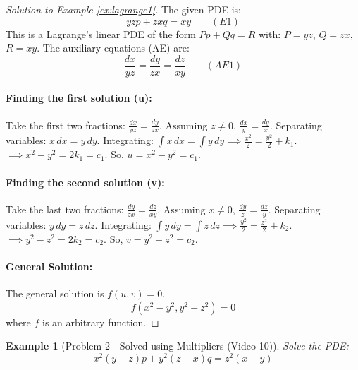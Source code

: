 \documentclass{article}
\newtheorem{example}{Example}[section]    %
\theoremstyle{remark}
\begin{document}
	\begin{proof}[Solution to Example \ref{ex:lagrange1}]
		The given PDE is:
		\[ yzp + zxq = xy \quad \quad (E1) \]
		This is a Lagrange's linear PDE of the form $Pp + Qq = R$ with: $P = yz$, $Q = zx$, $R = xy$.
		The auxiliary equations (AE) are:
		\[
		\frac{dx}{yz} = \frac{dy}{zx} = \frac{dz}{xy} \quad \quad (AE1)
		\]
		\paragraph{Finding the first solution (u):}
		Take the first two fractions: $\frac{dx}{yz} = \frac{dy}{zx}$. Assuming $z \neq 0$, $\frac{dx}{y} = \frac{dy}{x}$.
		Separating variables: $x \, dx = y \, dy$.
		Integrating: $\int x \, dx = \int y \, dy \implies \frac{x^2}{2} = \frac{y^2}{2} + k_1$.
		$\implies x^2 - y^2 = 2k_1 = c_1$. So, $u = x^2 - y^2 = c_1$.
		
		\paragraph{Finding the second solution (v):}
		Take the last two fractions: $\frac{dy}{zx} = \frac{dz}{xy}$. Assuming $x \neq 0$, $\frac{dy}{z} = \frac{dz}{y}$.
		Separating variables: $y \, dy = z \, dz$.
		Integrating: $\int y \, dy = \int z \, dz \implies \frac{y^2}{2} = \frac{z^2}{2} + k_2$.
		$\implies y^2 - z^2 = 2k_2 = c_2$. So, $v = y^2 - z^2 = c_2$.
		
		\paragraph{General Solution:} The general solution is $f(u, v) = 0$.
		\[
		f(x^2 - y^2, y^2 - z^2) = 0
		\]
		where $f$ is an arbitrary function.
	\end{proof}
	
	\begin{example}[Problem 2 - Solved using Multipliers (Video 10)]
		\label{ex:lagrange2}
		Solve the PDE:
		\[ x^2(y-z)p + y^2(z-x)q = z^2(x-y) \]
	\end{example}
	
\end{document}
